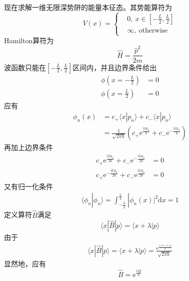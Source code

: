         现在求解一维无限深势阱的能量本征态。其势能算符为
        \begin{equation*}
            V(x) = \left \{
                \begin{aligned}
                    &0,\ x\in [-\frac L2, \frac L2 ]\\
                    &\infty, \ \mathrm{otherwise}
                \end{aligned}
                \right.
        \end{equation*}
        Hamilton算符为
        \begin{equation*}
            \hat{H} = \frac {\hat{p}^2}{2m}
        \end{equation*}
        波函数只能在$[-\frac L2, \frac L2 ]$区间内，并且边界条件给出
        \begin{align*}
            \phi(x = -\frac L2) &= 0\\
            \phi(x = \frac L2) &= 0
        \end{align*}
        应有
        \begin{align*}
            \phi_n(x) &= c_+ \langle x|p_n\rangle + c_- \langle x|p_n\rangle\\
            &= \frac 1{\sqrt{2\pi \hbar}}(c_+\mathrm{e}^{\frac {\mathrm{i}xp_n}{\hbar}}+c_-\mathrm{e}^{-\frac {\mathrm{i}xp_n}{\hbar}})
        \end{align*}
        再加上边界条件
        \begin{align*}
            c_+\mathrm{e}^{\frac {\mathrm{i}Lp_n}{2\hbar}}+c_-\mathrm{e}^{-\frac {\mathrm{i}Lp_n}{2\hbar}} &= 0\\
            c_+\mathrm{e}^{-\frac {\mathrm{i}Lp_n}{2\hbar}}+c_-\mathrm{e}^{\frac {\mathrm{i}Lp_n}{2\hbar}} &= 0
        \end{align*}
        又有归一化条件
        \begin{align*}
            \langle \phi_n | \phi_n \rangle = \int_{-\frac L2}^{\frac L2} |\phi_n(x)|^2 \mathrm{d}x = 1
        \end{align*}
        定义算符$\hat{B}$满足
        \[ \langle x|\hat{B}| p \rangle = \langle x+\lambda |p\rangle \]
        由于
        \begin{align*}
            \langle x|\hat{B}| p \rangle = \langle x+\lambda |p\rangle = \frac {\mathrm{e}^{\frac {\mathrm{i}(x+\lambda)p}{\hbar}}}{\sqrt{2\pi\hbar}}
        \end{align*}
        显然地，应有
        \begin{equation*}
            \hat{B} = \mathrm{e}^{\frac {\mathrm{i}\lambda \hat{p}}{\hbar}}
        \end{equation*}

